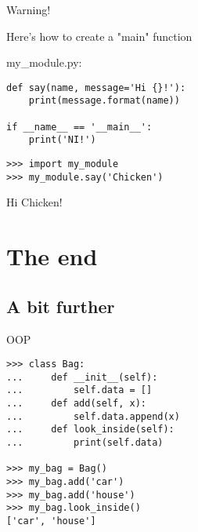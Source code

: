 \documentclass[ignorenonframetext,]{beamer}
\begin{document}
\begin{frame}[fragile]{Warning!}

    Here's how to create a "main" function

    my\_module.py:
    \begin{tcolorbox}
        \begin{verbatim}
def say(name, message='Hi {}!'):
    print(message.format(name))

if __name__ == '__main__':
    print('NI!')
        \end{verbatim}
    \end{tcolorbox}

    \begin{tcolorbox}
        \begin{verbatim}
>>> import my_module
>>> my_module.say('Chicken')
        \end{verbatim}
Hi Chicken!
    \end{tcolorbox}
\end{frame}

\section{The end}
\subsection{A bit further}

\begin{frame}[fragile]{OOP}
    \begin{tcolorbox}
        \begin{verbatim}
>>> class Bag:
...     def __init__(self):
...         self.data = []
...     def add(self, x):
...         self.data.append(x)
...     def look_inside(self):
...         print(self.data)

>>> my_bag = Bag()
>>> my_bag.add('car')
>>> my_bag.add('house')
>>> my_bag.look_inside()
['car', 'house']
        \end{verbatim}
    \end{tcolorbox}
\end{frame}
\end{document}
